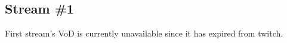 \subsection{Stream \#1}

First stream's VoD is currently unavailable since it has expired from twitch.